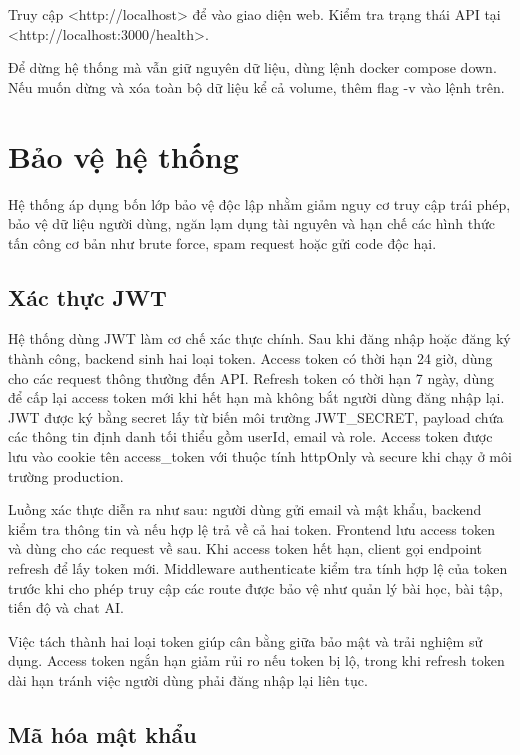 \documentclass[../main.tex]{subfiles}
\begin{document}
Truy cập <http://localhost> để vào giao diện web. Kiểm tra trạng thái API tại <http://localhost:3000/health>.

Để dừng hệ thống mà vẫn giữ nguyên dữ liệu, dùng lệnh docker compose down. Nếu muốn dừng và xóa toàn bộ dữ liệu kể cả volume, thêm flag -v vào lệnh trên.

\section{Bảo vệ hệ thống}

Hệ thống áp dụng bốn lớp bảo vệ độc lập nhằm giảm nguy cơ truy cập trái phép, bảo vệ dữ liệu người dùng, ngăn lạm dụng tài nguyên và hạn chế các hình thức tấn công cơ bản như brute force, spam request hoặc gửi code độc hại.

\subsection{Xác thực JWT}

Hệ thống dùng JWT làm cơ chế xác thực chính. Sau khi đăng nhập hoặc đăng ký thành công, backend sinh hai loại token. Access token có thời hạn 24 giờ, dùng cho các request thông thường đến API. Refresh token có thời hạn 7 ngày, dùng để cấp lại access token mới khi hết hạn mà không bắt người dùng đăng nhập lại. JWT được ký bằng secret lấy từ biến môi trường JWT\_SECRET, payload chứa các thông tin định danh tối thiểu gồm userId, email và role. Access token được lưu vào cookie tên access\_token với thuộc tính httpOnly và secure khi chạy ở môi trường production.

Luồng xác thực diễn ra như sau: người dùng gửi email và mật khẩu, backend kiểm tra thông tin và nếu hợp lệ trả về cả hai token. Frontend lưu access token và dùng cho các request về sau. Khi access token hết hạn, client gọi endpoint refresh để lấy token mới. Middleware authenticate kiểm tra tính hợp lệ của token trước khi cho phép truy cập các route được bảo vệ như quản lý bài học, bài tập, tiến độ và chat AI.

Việc tách thành hai loại token giúp cân bằng giữa bảo mật và trải nghiệm sử dụng. Access token ngắn hạn giảm rủi ro nếu token bị lộ, trong khi refresh token dài hạn tránh việc người dùng phải đăng nhập lại liên tục.

\subsection{Mã hóa mật khẩu}
\end{document}
